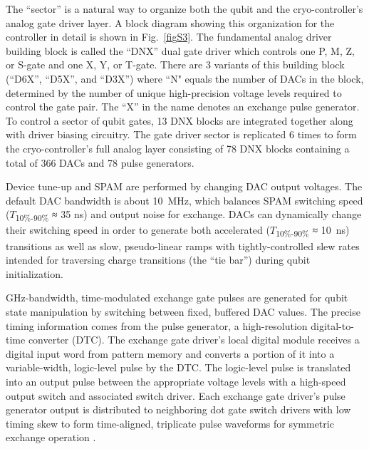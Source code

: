 \documentclass[aps,prl,twocolumn,superscriptaddress,nobibnotes,10pt,floatfix]{revtex4-2}
\newcommand{\figref}[1]{Fig.~\ref{#1}}
\begin{document}
The ``sector'' is a natural way to organize both the qubit and the cryo-controller's analog gate driver layer.
A block diagram showing this organization for the controller in detail is shown in \figref{figS3}.
The fundamental analog driver building block is called the ``DNX'' dual gate driver which controls one P, M, Z, or S-gate and one X, Y, or T-gate.
There are 3 variants of this building block (``D6X'', ``D5X'', and ``D3X'') where ``N" equals the number of DACs in the block, determined by the number of unique high-precision voltage levels required to control the gate pair.
The ``X'' in the name denotes an exchange pulse generator.
To control a sector of qubit gates, 13 DNX blocks are integrated together along with driver biasing circuitry.
The gate driver sector is replicated 6 times to form the cryo-controller's full analog layer consisting of 78 DNX blocks containing a total of 366 DACs and 78 pulse generators.

Device tune-up and SPAM are performed by changing DAC output voltages.
The default DAC bandwidth is about 10~MHz, which balances SPAM switching speed ($T$\textsubscript{10\%-90\%} ≈ 35 ns) and output noise for exchange.
DACs can dynamically change their switching speed in order to generate both accelerated ($T$\textsubscript{10\%-90\%} ≈ 10~ns) transitions as well as slow, pseudo-linear ramps with tightly-controlled slew rates intended for traversing charge transitions (the ``tie bar'') during qubit initialization.

GHz-bandwidth, time-modulated exchange gate pulses are generated for qubit state manipulation by switching between fixed, buffered DAC values.
The precise timing information comes from the pulse generator, a high-resolution digital-to-time converter (DTC).
The exchange gate driver's local digital module receives a digital input word from pattern memory and converts a portion of it into a variable-width, logic-level pulse by the DTC.
The logic-level pulse is translated into an output pulse between the appropriate voltage levels with a high-speed output switch and associated switch driver.
Each exchange gate driver's pulse generator output is distributed to neighboring dot gate switch drivers with low timing skew to form time-aligned, triplicate pulse waveforms for symmetric exchange operation \cite{s_reed_reduced_2016}.
\end{document}
